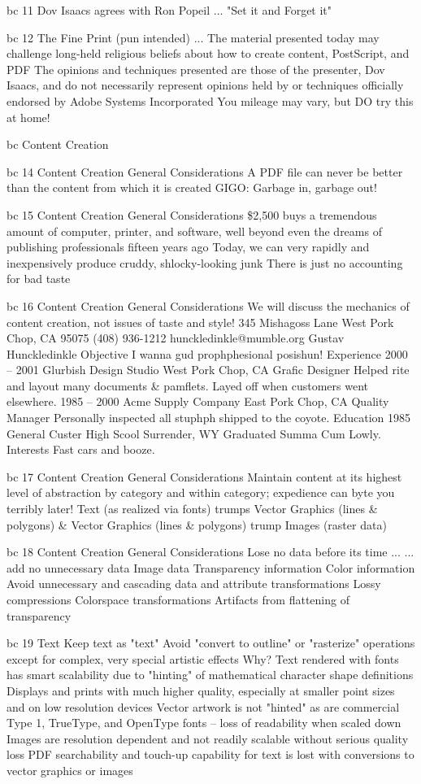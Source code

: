 \documentclass[11pt,a4paper]{article}
\begin{document}
bc 11 Dov Isaacs agrees with Ron Popeil ... "Set it and Forget it"

bc 12 The Fine Print (pun intended) ... The material presented today may challenge long-held religious beliefs about how to create content, PostScript, and PDF The opinions and techniques presented are those of the presenter, Dov Isaacs, and do not necessarily represent opinions held by or techniques officially endorsed by Adobe Systems Incorporated You mileage may vary, but DO try this at home!

bc Content Creation

bc 14 Content Creation General Considerations A PDF file can never be better than the content from which it is created GIGO: Garbage in, garbage out!

bc 15 Content Creation General Considerations \$2,500 buys a tremendous amount of computer, printer, and software, well beyond even the dreams of publishing professionals fifteen years ago Today, we can very rapidly and inexpensively produce cruddy, shlocky-looking junk There is just no accounting for bad taste

bc 16 Content Creation General Considerations We will discuss the mechanics of content creation, not issues of taste and style! 345 Mishagoss Lane West Pork Chop, CA 95075 (408) 936-1212 hunckledinkle@mumble.org Gustav Hunckledinkle Objective I wanna gud prophphesional posishun! Experience 2000 -- 2001 Glurbish Design Studio West Pork Chop, CA Grafic Designer Helped rite and layout many documents \& pamflets. Layed off when customers went elsewhere. 1985 -- 2000 Acme Supply Company East Pork Chop, CA Quality Manager Personally inspected all stuphph shipped to the coyote. Education 1985 General Custer High Scool Surrender, WY Graduated Summa Cum Lowly. Interests Fast cars and booze.

bc 17 Content Creation General Considerations Maintain content at its highest level of abstraction by category and within category; expedience can byte you terribly later! Text (as realized via fonts) trumps Vector Graphics (lines \& polygons) \& Vector Graphics (lines \& polygons) trump Images (raster data)

bc 18 Content Creation General Considerations Lose no data before its time ... ... add no unnecessary data Image data Transparency information Color information Avoid unnecessary and cascading data and attribute transformations Lossy compressions Colorspace transformations Artifacts from flattening of transparency

bc 19 Text Keep text as "text" Avoid "convert to outline" or "rasterize" operations except for complex, very special artistic effects Why? Text rendered with fonts has smart scalability due to "hinting" of mathematical character shape definitions Displays and prints with much higher quality, especially at smaller point sizes and on low resolution devices Vector artwork is not "hinted" as are commercial Type 1, TrueType, and OpenType fonts -- loss of readability when scaled down Images are resolution dependent and not readily scalable without serious quality loss PDF searchability and touch-up capability for text is lost with conversions to vector graphics or images
\end{document}
